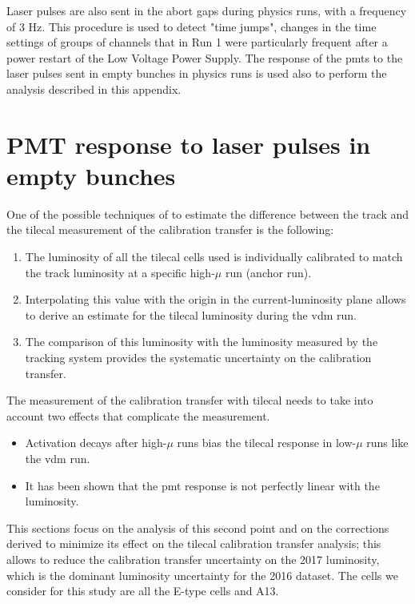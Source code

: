 Laser pulses are also sent in the abort gaps during physics runs, with a frequency of 
3 Hz. 
This procedure is used to detect "time jumps", changes in the time settings of groups of channels 
that in Run 1 were particularly frequent after a power restart of the Low Voltage Power
Supply.
The response of the \glspl{pmt} to the laser pulses sent in empty bunches in physics runs 
is used also to perform the analysis described in this appendix. 


\section{PMT response to laser pulses in empty bunches}
\label{sec:app:pmtresponse}

One of the possible techniques of to estimate 
the difference between the track and the \gls{tilecal} measurement of the calibration transfer is the following:
\begin{enumerate}
\item The luminosity of all the \gls{tilecal} cells used is individually calibrated to match the track luminosity 
at a specific high-$\mu$ run (anchor run).
\item Interpolating this value with the origin in the current-luminosity plane allows to derive an estimate for the \gls{tilecal} 
luminosity during the \gls{vdm} run.
\item The comparison of this luminosity with the luminosity measured by the tracking system provides the systematic uncertainty on the 
calibration transfer. 
\end{enumerate}
The measurement of the calibration transfer with \gls{tilecal} needs to take into account two effects that complicate the measurement. 
\begin{itemize}
\item Activation decays after high-$\mu$ runs bias the \gls{tilecal} response in low-$\mu$ runs like the \gls{vdm} run.
\item It has been shown that the \gls{pmt} response is not perfectly linear with the luminosity. 
\end{itemize}

This sections focus on the analysis of this second point and on the corrections derived to minimize its effect 
on the \gls{tilecal} calibration transfer analysis; this allows to reduce the calibration transfer uncertainty on the 
2017 luminosity, which is the dominant luminosity uncertainty for the 2016 dataset. 
The cells we consider for this study are all the E-type cells and A13.

